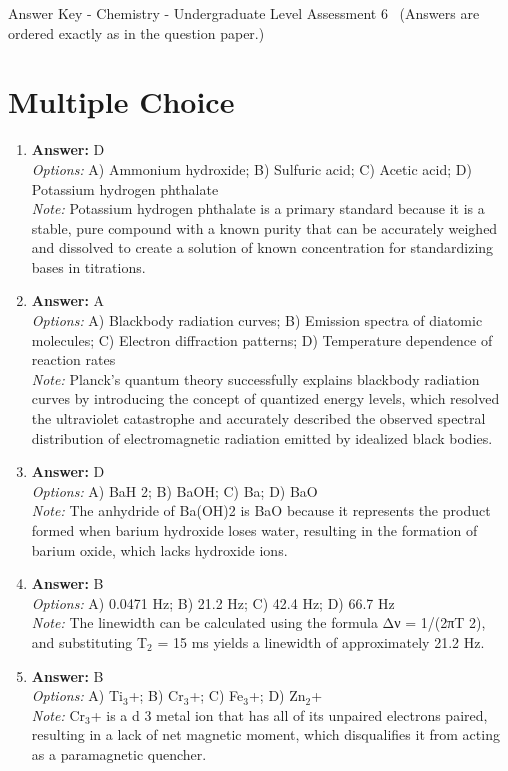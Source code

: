 \documentclass[12pt]{article}
\begin{document}
\begin{center}
Answer Key - Chemistry - Undergraduate Level Assessment 6 \
\small (Answers are ordered exactly as in the question paper.)
\end{center}

\section*{Multiple Choice}
\begin{enumerate}[label=\arabic*.]
\item \textbf{Answer:} D
\\ \textit{Options:} A) Ammonium hydroxide; B) Sulfuric acid; C) Acetic acid; D) Potassium hydrogen phthalate
\\ \textit{Note:} Potassium hydrogen phthalate is a primary standard because it is a stable, pure compound with a known purity that can be accurately weighed and dissolved to create a solution of known concentration for standardizing bases in titrations.
\item \textbf{Answer:} A
\\ \textit{Options:} A) Blackbody radiation curves; B) Emission spectra of diatomic molecules; C) Electron diffraction patterns; D) Temperature dependence of reaction rates
\\ \textit{Note:} Planck's quantum theory successfully explains blackbody radiation curves by introducing the concept of quantized energy levels, which resolved the ultraviolet catastrophe and accurately described the observed spectral distribution of electromagnetic radiation emitted by idealized black bodies.
\item \textbf{Answer:} D
\\ \textit{Options:} A) BaH 2; B) BaOH; C) Ba; D) BaO
\\ \textit{Note:} The anhydride of Ba(OH)2 is BaO because it represents the product formed when barium hydroxide loses water, resulting in the formation of barium oxide, which lacks hydroxide ions.
\item \textbf{Answer:} B
\\ \textit{Options:} A) 0.0471 Hz; B) 21.2 Hz; C) 42.4 Hz; D) 66.7 Hz
\\ \textit{Note:} The linewidth can be calculated using the formula Δν = 1/(2πT 2), and substituting T$_{2}$ = 15 ms yields a linewidth of approximately 21.2 Hz.
\item \textbf{Answer:} B
\\ \textit{Options:} A) Ti$_{3}$+; B) Cr$_{3}$+; C) Fe$_{3}$+; D) Zn$_{2}$+
\\ \textit{Note:} Cr$_{3}$+ is a d 3 metal ion that has all of its unpaired electrons paired, resulting in a lack of net magnetic moment, which disqualifies it from acting as a paramagnetic quencher.
\end{enumerate}
\end{document}
